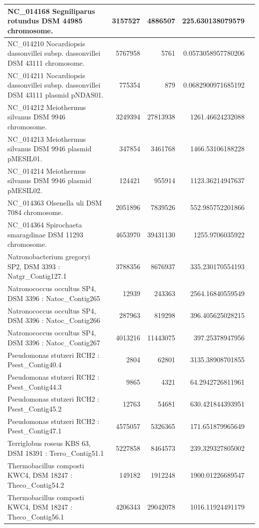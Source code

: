 \documentclass{bioinfo2}
\begin{document}
\begin{table}[p]
{\begin{tabular}{lrrrr}
\hline
NC\_014168 Segniliparus rotundus DSM 44985 chromosome. & 3157527 & 4886507 & 225.630138079579 \\
\hline
NC\_014210 Nocardiopsis dassonvillei subsp. dassonvillei DSM 43111 chromosome. & 5767958 & 5761 & 0.0573058957780206 \\
NC\_014211 Nocardiopsis dassonvillei subsp. dassonvillei DSM 43111 plasmid pNDAS01. & 775354 & 879 & 0.0682900971685192 \\
\hline
NC\_014212 Meiothermus silvanus DSM 9946 chromosome. & 3249394 & 27813938 & 1261.46624232088 \\
NC\_014213 Meiothermus silvanus DSM 9946 plasmid pMESIL01. & 347854 & 3461768 & 1466.53106188228 \\
NC\_014214 Meiothermus silvanus DSM 9946 plasmid pMESIL02. & 124421 & 955914 & 1123.36214947637 \\
\hline
NC\_014363 Olsenella uli DSM 7084 chromosome. & 2051896 & 7839526 & 552.985752201866 \\
\hline
NC\_014364 Spirochaeta smaragdinae DSM 11293 chromosome. & 4653970 & 39431130 & 1255.9706035922 \\
\hline
Natronobacterium gregoryi SP2, DSM 3393 : Natgr\_Contig127.1 & 3788356 & 8676937 & 335.230170554193 \\
\hline
Natronococcus occultus SP4, DSM 3396 : Natoc\_Contig265 & 12939 & 243363 & 2564.16840559549 \\
Natronococcus occultus SP4, DSM 3396 : Natoc\_Contig266 & 287963 & 819298 & 396.405625028215 \\
Natronococcus occultus SP4, DSM 3396 : Natoc\_Contig267 & 4013216 & 11443075 & 397.25378947956 \\
\hline
Pseudomonas stutzeri RCH2 : Psest\_Contig40.4 & 2804 & 62801 & 3135.38908701855 \\
Pseudomonas stutzeri RCH2 : Psest\_Contig44.3 & 9865 & 4321 & 64.2942726811961 \\
Pseudomonas stutzeri RCH2 : Psest\_Contig45.2 & 12763 & 54681 & 630.421844393951 \\
Pseudomonas stutzeri RCH2 : Psest\_Contig47.1 & 4575057 & 5326365 & 171.651879965649 \\
\hline
Terriglobus roseus KBS 63, DSM 18391 : Terro\_Contig51.1 & 5227858 & 8464573 & 239.329327805002 \\
\hline
Thermobacillus composti KWC4, DSM 18247 : Theco\_Contig54.2 & 149182 & 1912248 & 1900.01226689547 \\
Thermobacillus composti KWC4, DSM 18247 : Theco\_Contig56.1 & 4206343 & 29042078 & 1016.11924491179 \\

\end{tabular}}
\end{table}
\end{document}
